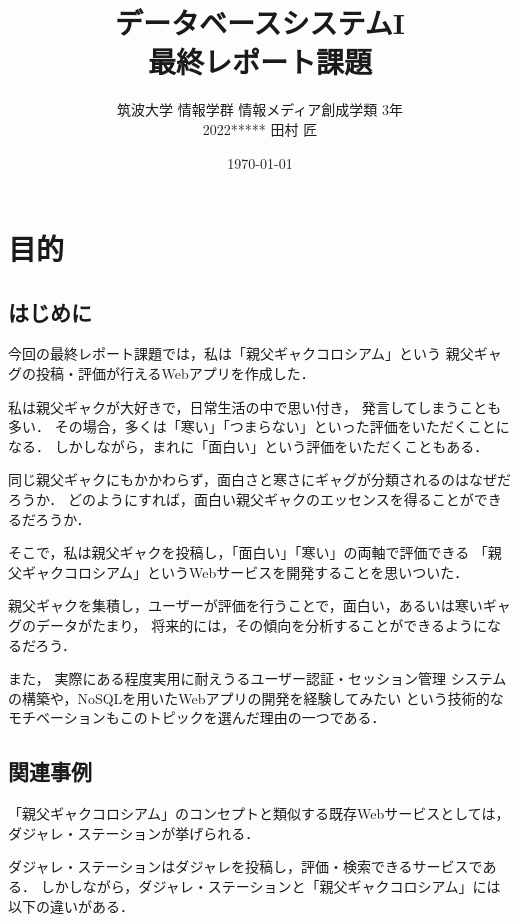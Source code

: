 \documentclass[a4paper,11pt]{jsreport}
\begin{document}
\title{データベースシステムI\\最終レポート課題}
\author{筑波大学 情報学群 情報メディア創成学類 3年\\ 2022***** 田村 匠}
\date{\today}
\maketitle

\tableofcontents

\chapter{目的}
\section{はじめに}
今回の最終レポート課題では，私は「親父ギャクコロシアム」という
親父ギャグの投稿・評価が行えるWebアプリを作成した．

私は親父ギャクが大好きで，日常生活の中で思い付き，
発言してしまうことも多い．
その場合，多くは「寒い」「つまらない」といった評価をいただくことになる．
しかしながら，まれに「面白い」という評価をいただくこともある．

同じ親父ギャクにもかかわらず，面白さと寒さにギャグが分類されるのはなぜだろうか．
どのようにすれば，面白い親父ギャクのエッセンスを得ることができるだろうか．

そこで，私は親父ギャクを投稿し，「面白い」「寒い」の両軸で評価できる
「親父ギャクコロシアム」というWebサービスを開発することを思いついた．

親父ギャクを集積し，ユーザーが評価を行うことで，面白い，あるいは寒いギャグのデータがたまり，
将来的には，その傾向を分析することができるようになるだろう．

また，
実際にある程度実用に耐えうるユーザー認証・セッション管理
システムの構築や，NoSQLを用いたWebアプリの開発を経験してみたい
という技術的なモチベーションもこのトピックを選んだ理由の一つである．

\section{関連事例}
「親父ギャクコロシアム」のコンセプトと類似する既存Webサービスとしては，
ダジャレ・ステーション\cite{dajare-sta}が挙げられる．

ダジャレ・ステーションはダジャレを投稿し，評価・検索できるサービスである．
しかしながら，ダジャレ・ステーションと「親父ギャクコロシアム」には以下の違いがある．
\end{document}
